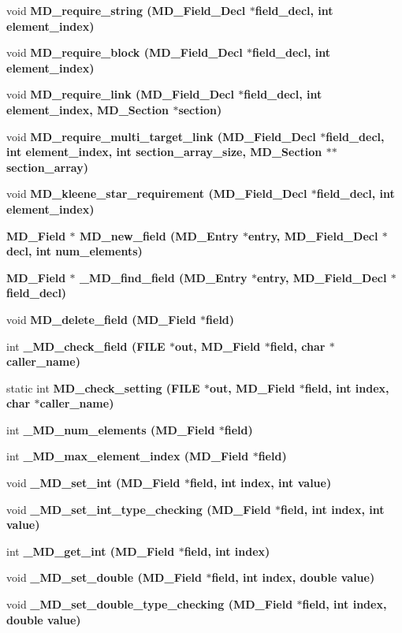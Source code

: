 \begin{CompactItemize}
\item 
void \bf{MD\_\-require\_\-string} (\bf{MD\_\-Field\_\-Decl} $\ast$field\_\-decl, int element\_\-index)
\item 
void \bf{MD\_\-require\_\-block} (\bf{MD\_\-Field\_\-Decl} $\ast$field\_\-decl, int element\_\-index)
\item 
void \bf{MD\_\-require\_\-link} (\bf{MD\_\-Field\_\-Decl} $\ast$field\_\-decl, int element\_\-index, \bf{MD\_\-Section} $\ast$section)
\item 
void \bf{MD\_\-require\_\-multi\_\-target\_\-link} (\bf{MD\_\-Field\_\-Decl} $\ast$field\_\-decl, int element\_\-index, int section\_\-array\_\-size, \bf{MD\_\-Section} $\ast$$\ast$section\_\-array)
\item 
void \bf{MD\_\-kleene\_\-star\_\-requirement} (\bf{MD\_\-Field\_\-Decl} $\ast$field\_\-decl, int element\_\-index)
\item 
\bf{MD\_\-Field} $\ast$ \bf{MD\_\-new\_\-field} (\bf{MD\_\-Entry} $\ast$\bf{entry}, \bf{MD\_\-Field\_\-Decl} $\ast$decl, int num\_\-elements)
\item 
\bf{MD\_\-Field} $\ast$ \bf{\_\-MD\_\-find\_\-field} (\bf{MD\_\-Entry} $\ast$\bf{entry}, \bf{MD\_\-Field\_\-Decl} $\ast$field\_\-decl)
\item 
void \bf{MD\_\-delete\_\-field} (\bf{MD\_\-Field} $\ast$field)
\item 
int \bf{\_\-MD\_\-check\_\-field} (FILE $\ast$out, \bf{MD\_\-Field} $\ast$field, char $\ast$caller\_\-name)
\item 
static int \bf{MD\_\-check\_\-setting} (FILE $\ast$out, \bf{MD\_\-Field} $\ast$field, int index, char $\ast$caller\_\-name)
\item 
int \bf{\_\-MD\_\-num\_\-elements} (\bf{MD\_\-Field} $\ast$field)
\item 
int \bf{\_\-MD\_\-max\_\-element\_\-index} (\bf{MD\_\-Field} $\ast$field)
\item 
void \bf{\_\-MD\_\-set\_\-int} (\bf{MD\_\-Field} $\ast$field, int index, int value)
\item 
void \bf{\_\-MD\_\-set\_\-int\_\-type\_\-checking} (\bf{MD\_\-Field} $\ast$field, int index, int value)
\item 
int \bf{\_\-MD\_\-get\_\-int} (\bf{MD\_\-Field} $\ast$field, int index)
\item 
void \bf{\_\-MD\_\-set\_\-double} (\bf{MD\_\-Field} $\ast$field, int index, double value)
\item 
void \bf{\_\-MD\_\-set\_\-double\_\-type\_\-checking} (\bf{MD\_\-Field} $\ast$field, int index, double value)
$$
\end{CompactItemize}
